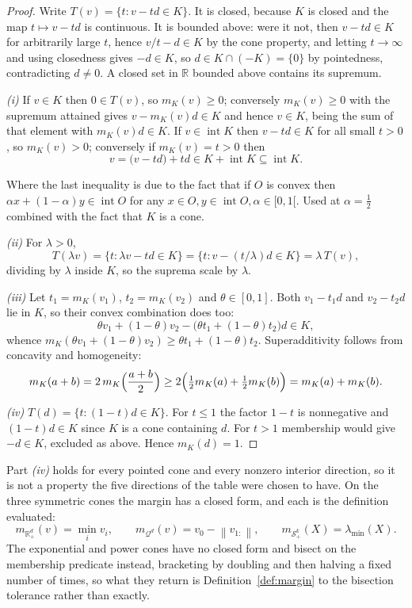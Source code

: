 \documentclass[a4paper,11pt]{book}
\theoremstyle{plain}
\theoremstyle{definition}
\theoremstyle{remark}
\numberwithin{equation}{chapter}
\numberwithin{algorithm}{chapter}
\newcommand{\R}{\mathbb{R}}
\newcommand{\Sp}{\mathcal{S}}
\newcommand{\norm}[1]{\left\|#1\right\|}
\newcommand{\intr}{\operatorname{int}}
\begin{document}
	\begin{proof}
		Write $T(v)=\{t:v-td\in K\}$. It is closed, because $K$ is closed and the
		map $t\mapsto v-td$ is continuous. It is bounded above: were it not, then
		$v-td\in K$ for arbitrarily large $t$, hence $v/t-d\in K$ by the cone
		property, and letting $t\to\infty$ and using closedness gives $-d\in K$, so
		$d\in K\cap(-K)=\{0\}$ by pointedness, contradicting $d\neq0$. A closed set  in $\mathbb{R}$
		bounded above contains its supremum.

		\emph{(i)} If $v\in K$ then $0\in T(v)$, so $m_K(v)\geq0$; conversely
		$m_K(v)\geq0$ with the supremum attained gives $v-m_K(v)d\in K$ and hence
		$v\in K$, being the sum of that element with $m_K(v)d\in K$. If
		$v\in\intr K$ then $v-td\in K$ for all small $t>0$, so $m_K(v)>0$;
		conversely if $m_K(v)=t>0$ then
		\[
		v=\bigl(v-td\bigr)+td\in K+\intr K\subseteq\intr K .
		\]
		
		Where the last inequality is due to the fact that if $O$ is convex then   $\alpha x +(1-\alpha) y \in \intr O $ for any $x\in O,y \in \intr O,\alpha \in [0,1[$. Used at $\alpha = \frac{1}{2}$ combined with the fact that $K$ is a cone.
		
		\emph{(ii)} For $\lambda>0$,
		\[
		T(\lambda v)=\{t:\lambda v-td\in K\}
		=\{t:v-(t/\lambda)d\in K\}=\lambda\,T(v) ,
		\]
		dividing by $\lambda$ inside $K$, so the suprema scale by $\lambda$.

		\emph{(iii)} Let $t_1=m_K(v_1)$, $t_2=m_K(v_2)$ and $\theta\in[0,1]$. Both
		$v_1-t_1d$ and $v_2-t_2d$ lie in $K$, so their convex combination does too:
		\[
		\theta v_1+(1-\theta)v_2-\bigl(\theta t_1+(1-\theta)t_2\bigr)d\in K ,
		\]
		whence $m_K(\theta v_1+(1-\theta)v_2)\geq\theta t_1+(1-\theta)t_2$.
		Superadditivity follows from concavity and homogeneity:
		\[
		m_K(a+b)=2\,m_K\Bigl(\frac{a+b}{2}\Bigr)
		\geq2\Bigl(\tfrac12m_K(a)+\tfrac12m_K(b)\Bigr)=m_K(a)+m_K(b) .
		\]

		\emph{(iv)} $T(d)=\{t:(1-t)d\in K\}$. For $t\leq1$ the factor $1-t$ is
		nonnegative and $(1-t)d\in K$ since $K$ is a cone containing $d$. For $t>1$
		membership would give $-d\in K$, excluded as above. Hence
		$m_K(d)=1$.
	\end{proof}

	Part \emph{(iv)} holds for every pointed cone and every nonzero interior
	direction, so it is not a property the five directions of the table were
	chosen to have. On the three symmetric cones the margin has a closed form,
	and each is the definition evaluated:
	\begin{equation}
		m_{\R^d_+}(v)=\min_iv_i,
		\qquad
		m_{\mathcal{Q}^d}(v)=v_0-\norm{v_{1:}},
		\qquad
		m_{\Sp^k_+}(X)=\lambda_{\min}(X) .
	\end{equation}
	 The
	exponential and power cones have no closed form and bisect on the membership
	predicate instead, bracketing by doubling and then halving a fixed number of
	times, so what they return is Definition~\ref{def:margin} to the bisection
	tolerance rather than exactly.
\end{document}
